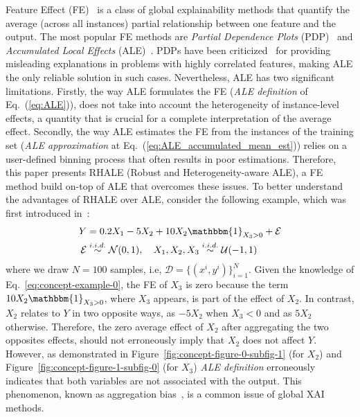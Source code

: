 \documentclass{ecai}  %
\begin{document}
Feature Effect (FE)~\cite{Gromping2020MAEP} is a class of global
explainability methods that quantify the average (across all
instances) partial relationship between one feature and the output.
The most popular FE methods are \emph{Partial Dependence Plots}
(PDP)~\cite{friedman2001greedy} and \emph{Accumulated Local Effects}
(ALE)~\cite{apley2020visualizing}. PDPs have been
criticized~\cite{baniecki2021fooling, molnar2022, molnar2022general} for providing
misleading explanations in problems with highly correlated features,
making ALE the only reliable solution in such cases. Nevertheless, ALE
has two significant limitations. Firstly, the way ALE formulates the
FE (\textit{ALE definition} of Eq.~(\ref{eq:ALE})), does not take into
account the heterogeneity of instance-level effects, a quantity that
is crucial for a complete interpretation of the average
effect. Secondly, the way ALE estimates the FE from the instances of
the training set (\textit{ALE approximation} at
Eq.~(\ref{eq:ALE_accumulated_mean_est})) relies on a user-defined
binning process that often results in poor estimations.  Therefore,
this paper presents RHALE (Robust and Heterogeneity-aware ALE), a FE
method build on-top of ALE that overcomes these issues. To better
understand the advantages of RHALE over ALE, consider the following
example, which was first introduced in~\cite{goldstein2015peeking}:
%
\begin{equation}
  \label{eq:concept-example-0}
  \begin{aligned}
  Y &= 0.2X_1 - 5X_2 + 10X_2 \mathbbm{1}_{X_3 > 0} + \mathcal{E}\\
  \mathcal{E} &\stackrel{i.i.d.}{\sim} \mathcal{N}(0,1), \quad X_1, X_2, X_3 \stackrel{i.i.d.}{\sim} \mathcal{U}(-1, 1)
  \end{aligned}
\end{equation}
%
where we draw \(N=100\) samples, i.e,
\(\mathcal{D} = \{(x^i, y^i)\}_{i=1}^{N}\). Given the knowledge of
Eq.~\eqref{eq:concept-example-0}, the FE of \(X_3\) is zero because
the term \(10X_2\mathbbm{1}_{X_3 > 0}\), where \(X_3\) appears, is
part of the effect of \(X_2\).  In contrast, \(X_2\) relates to \(Y\)
in two opposite ways, as \(-5X_2\) when \(X_3 < 0\) and as \(5 X_2\)
otherwise. Therefore, the zero average effect of \(X_2\) after
aggregating the two opposites effects, should not erroneously imply
that \(X_2\) does not affect \(Y\). However, as demonstrated in
Figure~\ref{fig:concept-figure-0-subfig-1} (for \(X_2\)) and
Figure~\ref{fig:concept-figure-1-subfig-0} (for \(X_3\)) \textit{ALE
  definition} erroneously indicates that both variables are not
associated with the output. This phenomenon, known as aggregation
bias~\cite{mehrabi2021survey, herbinger2022repid}, is a common issue
of global XAI methods.
\end{document}

